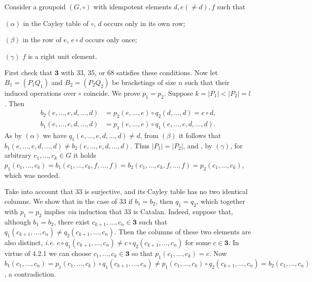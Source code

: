 \documentclass[a4paper,reqno]{amsart}\usepackage{amssymb,latexsym}
\theoremstyle{definition}
\theoremstyle{remark}
\numberwithin{equation}{section}
\numberwithin{theorem}{section}
\begin{document}
\smallskip

Consider a groupoid $(G,\circ)$ with idempotent elements $d,e(\neq d),f$ such that

\smallskip

\noindent$\left(  \alpha\right)  $ in the Cayley table of $\circ$, $d$ occurs
only in its own row;

\noindent$\left(  \beta\right)  $ in the row of $e$, $e\circ d$ occurs only once;

\noindent$\left(  \gamma\right)  $ $f$ is a right unit element.

\smallskip

First check that $\mathbf{3}$ with 33, 35, or 68 satisfies these conditions.
Now let $B_{1}=(P_{1}Q_{1})$ and $B_{2}=(P_{2}Q_{2})$ be bracketings of size
$n$ such that their induced operations over $\circ$ coincide. We prove
$p_{1}=p_{2}$. Suppose $k=|P_{1}|<|P_{2}|=l$. Then
\begin{align*}
b_{2}(e,\ldots,e,d,\ldots,d)  &  =p_{2}(e,\ldots,e)\circ q_{2}(d,\ldots
,d)=e\circ d,\\
b_{1}(e,\ldots,e,d,\ldots,d)  &  =p_{1}(e,\ldots,e)\circ q_{1}(e,\ldots
,e,d,\ldots,d).
\end{align*}
As by $\left(  \alpha\right)  $ we have $q_{1}(e,\ldots,e,d,\ldots,d)\neq d$,
from $\left(  \beta\right)  $ it follows that $b_{1}(e,\ldots,e,\allowbreak
d,\ldots,d)\neq b_{2}(e,\ldots,e,d,\ldots,d)$. Thus $|P_{1}|=|P_{2}|$, and ,
by $\left(  \gamma\right)  $, for arbitrary $c_{1},\ldots,c_{k}\in G$ it holds
$p_{1}(c_{1},\ldots,c_{k})=b_{1}(c_{1},\ldots,c_{k},f,\ldots,f)=b_{2}(c_{1},\ldots,c_{k},\allowbreak f,\ldots,f)=p_{2}(c_{1},\ldots,c_{k})$, which
was needed.

Take into account that 33 is surjective, and its Cayley table has no two
identical columns. We show that in the case of 33 if $b_{1}=b_{2}$, then
$q_{1}=q_{2}$, which together with $p_{1}=p_{2}$ implies \textit{via}
induction that 33 is Catalan. Indeed, suppose that, although $b_{1}=b_{2}$,
there exist $c_{k+1},\ldots,c_{n}\in\mathbf{3}$ such that $q_{1}(c_{k+1},\ldots,c_{n})\neq q_{2}(c_{k+1},\ldots,c_{n})$. Then the columns of
these two elements are also distinct, \textit{i.e.} $c\circ q_{1}(c_{k+1},\ldots,c_{n})\neq c\circ q_{2}(c_{k+1},\ldots,c_{n})$ for some
$c\in\mathbf{3}$. In virtue of 4.2.1 we can choose $c_{1},\ldots,c_{k}\in\mathbf{3}$ so that $p_{1}(c_{1},\ldots,c_{k})=c$. Now $b_{1}(c_{1},\ldots,c_{n})=p_{1}(c_{1},\ldots,c_{k})\circ q_{1}(c_{k+1},\ldots,c_{n})\neq
p_{1}(c_{1},\ldots,c_{k})\circ q_{2}(c_{k+1},\ldots,c_{n})=b_{2}(c_{1},\ldots,c_{n})$, a contradiction.
\end{document}
